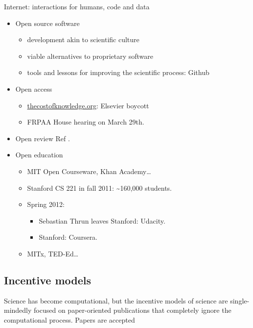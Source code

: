 \documentclass[ChapterTOCs,krantz2]{krantz} %
\begin{document}
Internet: interactions for humans, code and data

\begin{itemize}
\item Open source software

\begin{itemize}
\item development akin to scientific culture
\item viable alternatives to proprietary software
\item tools and lessons for improving the scientific process: Github
\end{itemize}

\item Open access

\begin{itemize}
\item \url{thecostofknowledge.org}: Elsevier boycott
\item FRPAA House hearing on March 29th.
\end{itemize}

\item Open review
Ref \cite{10.3389/fncom.2012.00018}.

\item Open education

\begin{itemize}
\item MIT Open Courseware, Khan Academy\ldots
\item Stanford CS 221 in fall 2011: \textasciitilde{}160,000 students.
\item Spring 2012:

\begin{itemize}
\item Sebastian Thrun leaves Stanford: Udacity.
\item Stanford: Coursera.
\end{itemize}
\item MITx, TED-Ed\ldots
\end{itemize}
\end{itemize}

\subsection{Incentive models}

Science has become computational, but the incentive models of science
are single-mindedly focused on paper-oriented publications that completely
ignore the computational process. Papers are accepted 
\end{document}
